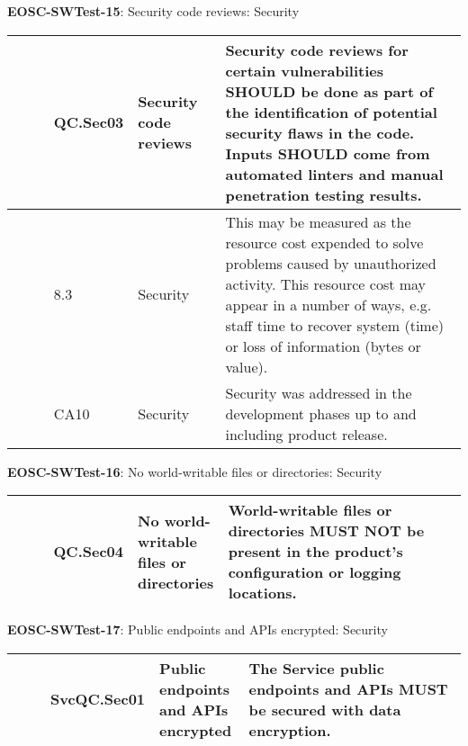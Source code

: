 \textbf{EOSC-SWTest-15}: Security code reviews: Security
\nopagebreak[4]
\begin{center}
    \tabletail{\hline}
    \tiny
    \begin{supertabular}{|p{0.10\linewidth}|p{0.10\linewidth}|p{0.20\linewidth}|p{0.60\linewidth}|} \hline
        \cite{orviz_set_2017} & QC.Sec03 & Security code reviews & Security code reviews for certain vulnerabilities SHOULD be done as part of the identification of potential security flaws in the code. Inputs SHOULD come from automated linters and manual penetration testing results.\\ \hline
        \cite{gillies_modelling_1992} & 8.3 & Security & This may be measured as the resource cost expended to solve problems caused by unauthorized activity. This resource cost may appear in a number of ways, e.g. staff time to recover system (time) or loss of information (bytes or value).\\ \hline
        \cite{shepherdson_cessda_2019} & CA10 & Security & Security was addressed in the development phases up to and including product release.\\ \hline
    \end{supertabular}
\end{center}

\textbf{EOSC-SWTest-16}: No world-writable files or directories: Security
\nopagebreak[4]
\begin{center}
    \tabletail{\hline}
    \tiny
    \begin{supertabular}{|p{0.10\linewidth}|p{0.10\linewidth}|p{0.20\linewidth}|p{0.60\linewidth}|} \hline
        \cite{orviz_set_2017} & QC.Sec04 & No world-writable files or directories & World-writable files or directories MUST NOT be present in the product's configuration or logging locations.\\ \hline
    \end{supertabular}
\end{center}

\textbf{EOSC-SWTest-17}: Public endpoints and APIs encrypted: Security
\nopagebreak[4]
\begin{center}
    \tabletail{\hline}
    \tiny
    \begin{supertabular}{|p{0.10\linewidth}|p{0.10\linewidth}|p{0.20\linewidth}|p{0.60\linewidth}|} \hline
        \cite{orviz_fernandez_eosc-synergy_2020} & SvcQC.Sec01 & Public endpoints and APIs encrypted & The Service public endpoints and APIs MUST be secured with data encryption.\\ \hline
    \end{supertabular}
\end{center}

